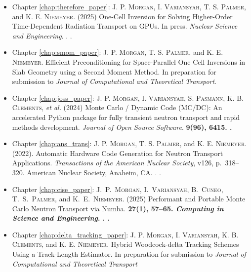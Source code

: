 \begin{itemize}
    \item Chapter \ref{chap:therefore_paper}: \textsc{J. P. Morgan}, \textsc{I. Variansyah}, \textsc{T. S. Palmer}, and \textsc{K. E. Niemeyer}. (2025) One-Cell Inversion for Solving Higher-Order Time-Dependent Radiation Transport on GPUs. In press. \emph{Nuclear Science and Engineering}. . .

    \item Chapter \ref{chap:smom_paper}: \textsc{J. P. Morgan},  \textsc{T. S. Palmer}, and \textsc{K. E. Niemeyer}. Efficient Preconditioning for Space-Parallel One Cell Inversions in Slab Geometry using a Second Moment Method. In preparation for submission to \emph{Journal of Computational and Theoretical Transport}.

    \item Chapter \ref{chap:joss_paper}: \textsc{J. P. Morgan}, \textsc{I. Variansyah}, \textsc{S. Pasmann}, \textsc{K. B. Clements}, \textit{et al.} (2024) Monte Carlo / Dynamic Code (MC/DC): An accelerated Python package for fully transient neutron transport and rapid methods development. \emph{Journal of Open Source Software}. \bf{9}(96), 6415. .

    \item Chapter \ref{chap:ans_trans}: \textsc{J. P. Morgan}, \textsc{T. S. Palmer}, and \textsc{K. E. Niemeyer}. (2022). Automatic Hardware Code Generation for Neutron Transport Applications. \emph{Transactions of the American Nuclear Society}, v126, p.~318--320. American Nuclear Society, Anaheim, CA. . .

    \item Chapter \ref{chap:cise_paper}: \textsc{J.~P.~Morgan}, \textsc{I.~Variansyah}, \textsc{B.~Cuneo}, \textsc{T.~S.~Palmer}, and \textsc{K.~E.~Niemeyer}. (2025) Performant and Portable Monte Carlo Neutron Transport via Numba. \bf{27}(1), 57--65. \emph{Computing in Science and Engineering}. . .

    \item Chapter \ref{chap:delta_tracking_paper}: \textsc{J. P. Morgan}, \textsc{I. Variansyah}, \textsc{K. B. Clements}, and \textsc{K. E. Niemeyer}. Hybrid Woodcock-delta Tracking Schemes Using a Track-Length Estimator. In preparation for submission to \emph{Journal of Computational and Theoretical Transport}
    
\end{itemize}

